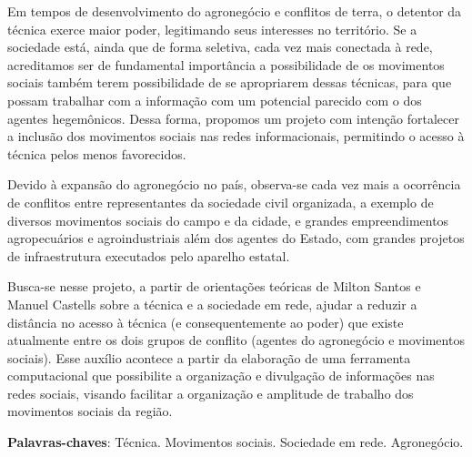 \begin{resumoumacoluna}
Em tempos de desenvolvimento do agronegócio e conflitos de terra, o detentor da técnica exerce maior poder, legitimando seus interesses no território. Se a sociedade está, ainda que de forma seletiva, cada vez mais conectada à rede, acreditamos ser de fundamental importância a possibilidade de os movimentos sociais também terem possibilidade de se apropriarem dessas técnicas, para que possam trabalhar com a informação com um potencial parecido com o dos agentes hegemônicos. Dessa forma, propomos um projeto com intenção fortalecer a inclusão dos movimentos sociais nas redes informacionais, permitindo o acesso à técnica pelos menos favorecidos.

Devido à expansão do agronegócio no país, observa-se cada vez mais a ocorrência de  conflitos entre representantes da sociedade civil organizada, a exemplo de diversos movimentos sociais do campo e da cidade, e grandes empreendimentos agropecuários e agroindustriais além dos agentes do Estado, com  grandes projetos de infraestrutura executados pelo aparelho estatal.


Busca-se nesse projeto, a partir de orientações teóricas de Milton Santos e Manuel Castells sobre a técnica e a sociedade em rede, ajudar a reduzir a distância no acesso à técnica (e consequentemente ao poder) que existe atualmente entre os dois grupos de conflito (agentes do agronegócio e movimentos sociais). Esse auxílio acontece a partir da elaboração de uma ferramenta computacional que possibilite a organização e divulgação de informações nas redes sociais, visando facilitar a organização e amplitude de trabalho dos movimentos sociais da região.

 \vspace{\onelineskip}
 \noindent
 \textbf{Palavras-chaves}: Técnica. Movimentos sociais. Sociedade em rede. Agronegócio.
\end{resumoumacoluna}

